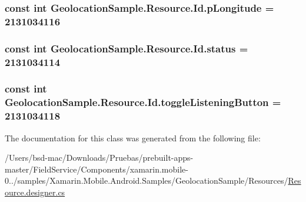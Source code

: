 \hypertarget{class_geolocation_sample_1_1_resource_1_1_id_af3b73175fd4d7cf7a4a1681315e6f3af}{
\subsubsection[{p\+Longitude}]{\setlength{\rightskip}{0pt plus 5cm}const int Geolocation\+Sample.\+Resource.\+Id.\+p\+Longitude = 2131034116}}\label{class_geolocation_sample_1_1_resource_1_1_id_af3b73175fd4d7cf7a4a1681315e6f3af}
\hypertarget{class_geolocation_sample_1_1_resource_1_1_id_a31f9e06f3aaa9196c4cea90e06201c7c}{
\subsubsection[{status}]{\setlength{\rightskip}{0pt plus 5cm}const int Geolocation\+Sample.\+Resource.\+Id.\+status = 2131034114}}\label{class_geolocation_sample_1_1_resource_1_1_id_a31f9e06f3aaa9196c4cea90e06201c7c}
\hypertarget{class_geolocation_sample_1_1_resource_1_1_id_a768d752d2e063a7351c37f7c8231e382}{
\subsubsection[{toggle\+Listening\+Button}]{\setlength{\rightskip}{0pt plus 5cm}const int Geolocation\+Sample.\+Resource.\+Id.\+toggle\+Listening\+Button = 2131034118}}\label{class_geolocation_sample_1_1_resource_1_1_id_a768d752d2e063a7351c37f7c8231e382}


The documentation for this class was generated from the following file\+:\begin{DoxyCompactItemize}
\item 
/\+Users/bsd-\/mac/\+Downloads/\+Pruebas/prebuilt-\/apps-\/master/\+Field\+Service/\+Components/xamarin.\+mobile-\/0../samples/\+Xamarin.\+Mobile.\+Android.\+Samples/\+Geolocation\+Sample/\+Resources/\hyperlink{_components_2xamarin_8mobile-0_86_81_2samples_2_xamarin_8_mobile_8_android_8_samples_2_geolocati70c310c330f4a850881b004033a4fa1f}{Resource.\+designer.\+cs}\end{DoxyCompactItemize}
